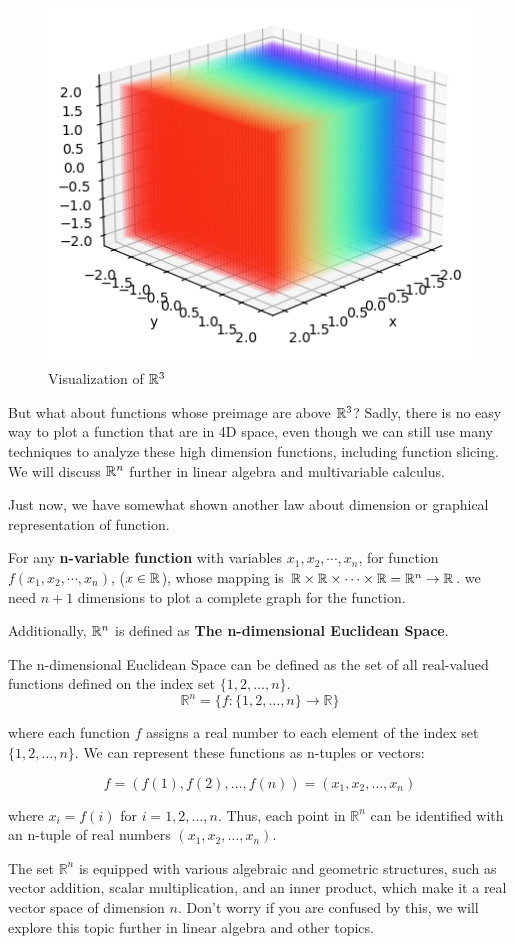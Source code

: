 		\begin{figure}[H]
			\centering
			\includegraphics[width=0.7\linewidth]{Images/R^3}
			\caption[]{Visualization of $\mathbb{R}^3$}
			\label{fig:r3}
		\end{figure}
		But what about functions whose preimage are above $\mathbb{R}^3$? Sadly, there is no easy way to plot a function that are in 4D space, even though we can still use many techniques to analyze these
		high dimension functions, including function slicing. We will discuss $\mathbb{R}^n$ further in linear algebra and multivariable calculus. 
		
		Just now, we have somewhat shown another law about dimension or graphical representation of function.
		\begin{proposition}
			For any \textbf{n-variable function} with variables $x_1, x_2, \cdots, x_n$, for function $f(x_1,x_2,\cdots, x_n)$, ($x\in \mathbb{R}$), whose mapping is $\mathbb{R} \times \mathbb{R} \times \cdots \times \mathbb{R} = \mathbb{R}^n \to \mathbb{R}$.
			we need $n+1$ dimensions to plot a complete graph for the function. 
		\end{proposition}
		
		
		Additionally, $\mathbb{R}^n$ is defined as \textbf{The n-dimensional Euclidean Space}.
		\begin{definition}
		The n-dimensional Euclidean Space can be defined as the set of all real-valued functions defined on the index set $\{1, 2, \ldots, n\}$.
			\[\mathbb{R}^n = \{f \colon \{1, 2, \ldots, n\} \to \mathbb{R}\}\]
			
			where each function $f$ assigns a real number to each element of the index set $\{1, 2, \ldots, n\}$. We can represent these functions as n-tuples or vectors:
			
			\[f = (f(1), f(2), \ldots, f(n)) = (x_1, x_2, \ldots, x_n)\]
			
			where $x_i = f(i)$ for $i = 1, 2, \ldots, n$. Thus, each point in $\mathbb{R}^n$ can be identified with an n-tuple of real numbers $(x_1, x_2, \ldots, x_n)$.
			
			The set $\mathbb{R}^n$ is equipped with various algebraic and geometric structures, such as vector addition, scalar multiplication, and an inner product, which make it a real vector space of dimension $n$. Don't worry if you are confused by this, we will explore this topic further in linear algebra and other topics.
		\end{definition}
		
